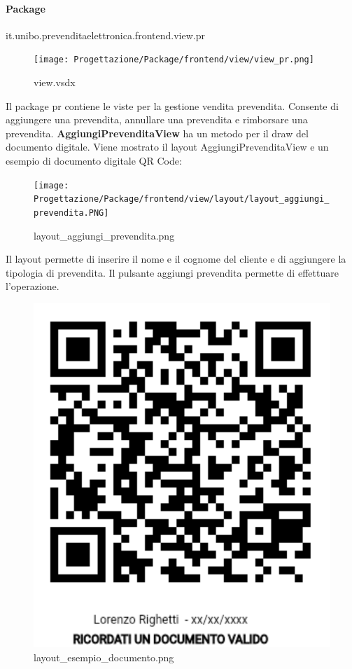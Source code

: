 \documentclass[a4paper]{article}
\begin{document}
\newpage

\paragraph{Package} it.unibo.prevenditaelettronica.frontend.view.pr


\begin{figure}[H]
    \texttt{[image: Progettazione/Package/frontend/view/view\_pr.png]}
    \centering
    \caption{view.vsdx}
\end{figure}

Il package pr contiene le viste per la gestione vendita prevendita. Consente di aggiungere una prevendita, annullare una prevendita e rimborsare una prevendita. \textbf{AggiungiPrevenditaView} ha un metodo per il draw del documento digitale. Viene mostrato il layout AggiungiPrevenditaView e un esempio di documento digitale QR Code:

\begin{figure}[H]
    \texttt{[image: Progettazione/Package/frontend/view/layout/layout\_aggiungi\_prevendita.PNG]}
    \centering
    \caption{layout\_aggiungi\_prevendita.png}
\end{figure}

Il layout permette di inserire il nome e il cognome del cliente e di aggiungere la tipologia di prevendita. Il pulsante aggiungi prevendita permette di effettuare l'operazione.

\begin{figure}[H]
    \includegraphics[scale=0.2]{Progettazione/esempio_documento.png}
    \centering
    \caption{layout\_esempio\_documento.png}
\end{figure}
\end{document}
